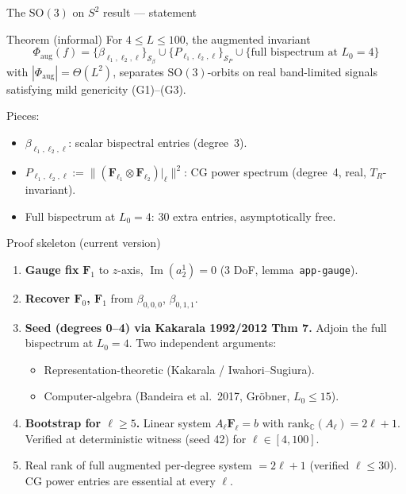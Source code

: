 \documentclass[10pt,aspectratio=169]{beamer}
\newcommand{\C}{\mathbb{C}}
\newcommand{\SO}{\mathrm{SO}}
\newcommand{\im}{\operatorname{Im}}
\newcommand{\F}{\mathbf{F}}
\begin{document}
\begin{frame}{The $\SO(3)$ on $S^2$ result --- statement}
\begin{block}{Theorem (informal)}
For $4 \le L \le 100$, the augmented invariant
\[
  \Phi_\mathrm{aug}(f)
  = \bigl\{\beta_{\ell_1,\ell_2,\ell}\bigr\}_{\mathcal S_\beta}
    \cup \bigl\{P_{\ell_1,\ell_2,\ell}\bigr\}_{\mathcal S_P}
    \cup \bigl\{\text{full bispectrum at } L_0=4\bigr\}
\]
with $|\Phi_\mathrm{aug}| = \Theta(L^2)$, separates $\SO(3)$-orbits on
real band-limited signals satisfying mild genericity (G1)--(G3).
\end{block}
\vspace{0.4em}
Pieces:
\begin{itemize}
  \item $\beta_{\ell_1,\ell_2,\ell}$: scalar bispectral entries (degree~3).
  \item $P_{\ell_1,\ell_2,\ell} := \|(\F_{\ell_1}\otimes \F_{\ell_2})|_\ell\|^2$:
        \alert{CG power spectrum} (degree~4, real, $T_R$-invariant).
  \item Full bispectrum at $L_0{=}4$: 30 extra entries, asymptotically free.
\end{itemize}
\end{frame}

\begin{frame}{Proof skeleton (current version)}
\begin{enumerate}
  \item \textbf{Gauge fix} $\F_1$ to $z$-axis, $\im(a_2^1) = 0$ \quad (3 DoF, lemma~\texttt{app-gauge}).
  \item \textbf{Recover $\F_0$, $\F_1$} from $\beta_{0,0,0}$, $\beta_{0,1,1}$.
  \item \textbf{Seed (degrees 0--4) via Kakarala 1992/2012 Thm 7.}
        Adjoin the full bispectrum at $L_0{=}4$. Two independent arguments:
        \begin{itemize}\small
          \item Representation-theoretic (Kakarala / Iwahori--Sugiura).
          \item Computer-algebra (Bandeira et al.\ 2017, Gröbner, $L_0 \le 15$).
        \end{itemize}
  \item \textbf{Bootstrap for $\ell \ge 5$.}
        Linear system $A_\ell \F_\ell = b$ with
        $\mathrm{rank}_{\C}(A_\ell) = 2\ell+1$. Verified at deterministic
        witness (seed 42) for $\ell \in [4,100]$.
  \item Real rank of full augmented per-degree system $= 2\ell+1$
        (verified $\ell \le 30$). \alert{CG power entries are essential at every $\ell$.}
\end{enumerate}
\end{frame}
\end{document}
